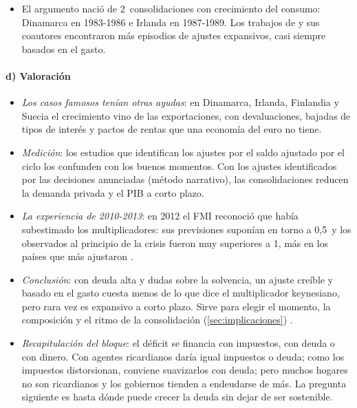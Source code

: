 \documentclass[11pt]{article}
\begin{document}
\begin{itemize}
\item El argumento nació de 2~consolidaciones con crecimiento del consumo: Dinamarca en 1983-1986 e Irlanda en 1987-1989\nocite{GiavazziPagano1990}. Los trabajos de  y sus coautores encontraron más episodios de ajustes expansivos, casi siempre basados en el gasto\nocite{AlesinaArdagna2010Large}.
\end{itemize}

\paragraph{d) Valoración}

\begin{itemize}
\item \emph{Los casos famosos tenían otras ayudas}: en Dinamarca, Irlanda, Finlandia y Suecia el crecimiento vino de las exportaciones, con devaluaciones, bajadas de tipos de interés y pactos de rentas que una economía del euro no tiene\nocite{Perotti2011Austerity}.
\item \emph{Medición}: los estudios que identifican los ajustes por el saldo ajustado por el ciclo los confunden con los buenos momentos. Con los ajustes identificados por las decisiones anunciadas (método narrativo), las consolidaciones reducen la demanda privada y el PIB a corto plazo\nocite{Guajardo2014Austeridad}.
\item \emph{La experiencia de 2010-2013}: en 2012 el FMI reconoció que había subestimado los multiplicadores: sus previsiones suponían en torno a 0,5~y los observados al principio de la crisis fueron muy superiores a 1, más en los países que más ajustaron\nocite{FMI2012WEOoct,BlanchardLeigh2013Growth}  .
\item \emph{Conclusión}: con deuda alta y dudas sobre la solvencia, un ajuste creíble y basado en el gasto cuesta menos de lo que dice el multiplicador keynesiano, pero rara vez es expansivo a corto plazo. Sirve para elegir el momento, la composición y el ritmo de la consolidación (\ref{sec:implicaciones}) .
\item \emph{Recapitulación del bloque}: el déficit se financia con impuestos, con deuda o con dinero. Con agentes ricardianos daría igual impuestos o deuda; como los impuestos distorsionan, conviene suavizarlos con deuda; pero muchos hogares no son ricardianos y los gobiernos tienden a endeudarse de más. La pregunta siguiente es hasta dónde puede crecer la deuda sin dejar de ser sostenible.
\end{itemize}
\end{document}
